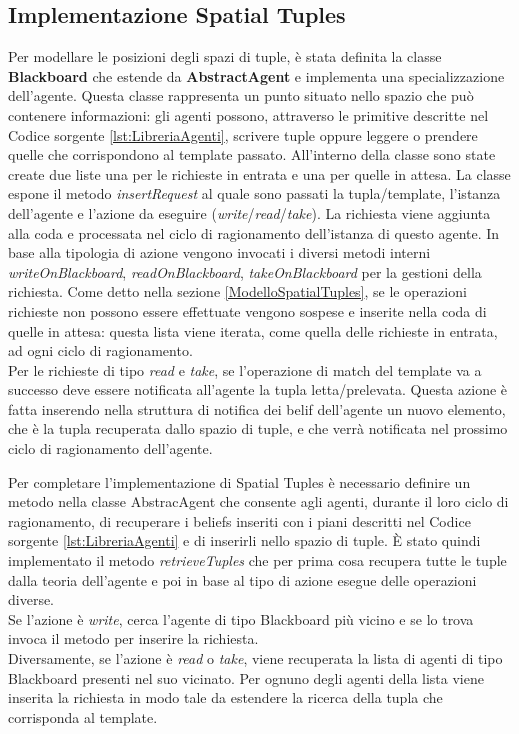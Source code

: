 \documentclass[12pt,a4paper,openright,twoside]{report}
\begin{document}
\subsection{Implementazione Spatial Tuples}
Per modellare le posizioni degli spazi di tuple, \`e stata definita la classe \textbf{Blackboard} che estende da \textbf{AbstractAgent} e implementa una specializzazione dell'agente. Questa classe rappresenta un punto situato nello spazio che pu\`o contenere informazioni: gli agenti possono, attraverso le primitive descritte nel Codice sorgente \ref{lst:LibreriaAgenti}, scrivere tuple oppure leggere o prendere quelle che corrispondono al template passato.
All'interno della classe sono state create due liste una per le richieste in entrata e una per quelle in attesa. La classe espone il metodo \textit{insertRequest} al quale sono passati la tupla/template, l'istanza dell'agente e l'azione da eseguire (\textit{write}/\textit{read}/\textit{take}). La richiesta viene aggiunta alla coda e processata nel ciclo di ragionamento dell'istanza di questo agente. In base alla tipologia di azione vengono invocati i diversi metodi interni \textit{writeOnBlackboard}, \textit{readOnBlackboard}, \textit{takeOnBlackboard} per la gestioni della richiesta.
Come detto nella sezione \ref{ModelloSpatialTuples}, se le operazioni richieste non possono essere effettuate vengono sospese e inserite nella coda di quelle in attesa: questa lista viene iterata, come quella delle richieste in entrata, ad ogni ciclo di ragionamento.
\\
Per le richieste di tipo \textit{read} e \textit{take}, se l'operazione di match del template va a successo deve essere notificata all'agente la tupla letta/prelevata. Questa azione \`e fatta inserendo nella struttura di notifica dei belif dell'agente un nuovo elemento, che \`e la tupla recuperata dallo spazio di tuple, e che verr\`a notificata nel prossimo ciclo di ragionamento dell'agente.

Per completare l'implementazione di Spatial Tuples \`e necessario definire un metodo nella classe AbstracAgent che consente agli agenti, durante il loro ciclo di ragionamento, di recuperare i beliefs inseriti con i piani descritti nel Codice sorgente \ref{lst:LibreriaAgenti} e di inserirli nello spazio di tuple. \`E stato quindi implementato il metodo \textit{retrieveTuples} che per prima cosa recupera tutte le tuple dalla teoria dell'agente e poi in base al tipo di azione esegue delle operazioni diverse.
\\
Se l'azione \`e \textit{write}, cerca l'agente di tipo Blackboard pi\`u vicino e se lo trova invoca il metodo per inserire la richiesta.
\\
Diversamente, se l'azione \`e \textit{read} o \textit{take}, viene recuperata la lista di agenti di tipo Blackboard presenti nel suo vicinato. Per ognuno degli agenti della lista viene inserita la richiesta in modo tale da estendere la ricerca della tupla che corrisponda al template.
\end{document}
